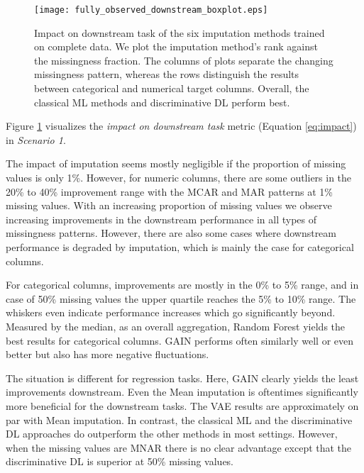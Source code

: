 \begin{figure}\centering
	\texttt{[image: fully\_observed\_downstream\_boxplot.eps]}

	\caption[Downstream Ranks - Fully Observed]{Impact on downstream task of the six imputation methods trained on complete data. We plot the imputation method's rank against the missingness fraction. The columns of plots separate the changing missingness pattern, whereas the rows distinguish the results between categorical and numerical target columns. Overall, the classical ML methods and discriminative DL perform best.
    }
	\label{fig:fully_observed_downstream_boxplot}
\end{figure}

Figure \ref{fig:fully_observed_downstream_boxplot} visualizes the \textit{impact on downstream task} metric (Equation \ref{eq:impact}) in \textit{Scenario 1}. 

The impact of imputation seems mostly negligible if the proportion of missing values is only 1\%. However, for numeric columns, there are some outliers in the 20\% to 40\% improvement range with the MCAR and MAR patterns at 1\% missing values. With an increasing proportion of missing values we observe increasing improvements in the downstream performance in all types of missingness patterns. However, there are also some cases where downstream performance is degraded by imputation, which is mainly the case for categorical columns.

For categorical columns, improvements are mostly in the 0\% to 5\% range, and in case of 50\% missing values the upper quartile reaches the 5\% to 10\% range. The whiskers even indicate performance increases which go significantly beyond. Measured by the median, as an overall aggregation, Random Forest yields the best results for categorical columns. GAIN performs often similarly well or even better but also has more negative fluctuations.

The situation is different for regression tasks. Here, GAIN clearly yields the least improvements downstream. Even the Mean imputation is oftentimes significantly more beneficial for the downstream tasks. The VAE results are approximately on par with Mean imputation. In contrast, the classical ML and the discriminative DL approaches do outperform the other methods in most settings. However, when the missing values are MNAR there is no clear advantage except that the discriminative DL is superior at 50\% missing values.

